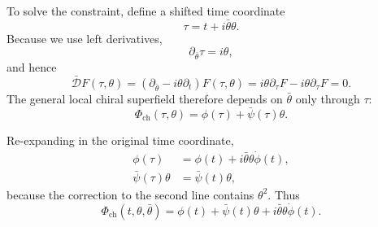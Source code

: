 To solve the constraint, define a shifted time coordinate
\begin{equation}
\tau=t+i\bar\theta\theta.
\label{eq:l7-chiral-time}
\end{equation}
Because we use left derivatives,
\begin{equation}
\partial_{\bar\theta}\tau=i\theta,
\end{equation}
and hence
\begin{equation}
\bar{\mathcal D}F(\tau,\theta)
=\left(\partial_{\bar\theta}-i\theta\partial_t\right)F(\tau,\theta)
=i\theta\partial_\tau F-i\theta\partial_\tau F=0.
\end{equation}
The general local chiral superfield therefore depends on \(\bar\theta\) only through \(\tau\):
\begin{equation}
\Phi_{\mathrm{ch}}(\tau,\theta)
=\phi(\tau)+\bar\psi(\tau)\theta.
\label{eq:l7-chiral-field-tau}
\end{equation}

\begin{classroomqa}
\end{classroomqa}

Re-expanding in the original time coordinate,
\begin{align}
\phi(\tau)
&=\phi(t)+i\bar\theta\theta\dot\phi(t),\\
\bar\psi(\tau)\theta
&=\bar\psi(t)\theta,
\end{align}
because the correction to the second line contains \(\theta^2\). Thus
\begin{equation}
\Phi_{\mathrm{ch}}(t,\theta,\bar\theta)
=\phi(t)+\bar\psi(t)\theta
+i\bar\theta\theta\dot\phi(t).
\label{eq:l7-chiral-field-components}
\end{equation}

\begin{classroomqa}
\end{classroomqa}

